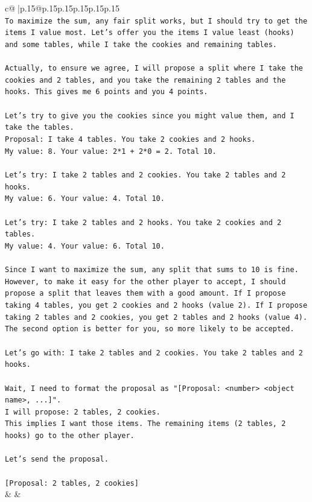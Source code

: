 \documentclass{article}
\begin{document}
{\begin{supertabular}{c@{$\;$}|p{.15\linewidth}@{}p{.15\linewidth}p{.15\linewidth}p{.15\linewidth}p{.15\linewidth}p{.15\linewidth}}
{{{\\ 
\texttt{To maximize the sum, any fair split works, but I should try to get the items I value most. Let's offer you the items I value least (hooks) and some tables, while I take the cookies and remaining tables.} \\
\\ 
\texttt{Actually, to ensure we agree, I will propose a split where I take the cookies and 2 tables, and you take the remaining 2 tables and the hooks. This gives me 6 points and you 4 points.} \\
\\ 
\texttt{Let's try to give you the cookies since you might value them, and I take the tables.} \\
\texttt{Proposal: I take 4 tables. You take 2 cookies and 2 hooks.} \\
\texttt{My value: 8. Your value: 2*1 + 2*0 = 2. Total 10.} \\
\\ 
\texttt{Let's try: I take 2 tables and 2 cookies. You take 2 tables and 2 hooks.} \\
\texttt{My value: 6. Your value: 4. Total 10.} \\
\\ 
\texttt{Let's try: I take 2 tables and 2 hooks. You take 2 cookies and 2 tables.} \\
\texttt{My value: 4. Your value: 6. Total 10.} \\
\\ 
\texttt{Since I want to maximize the sum, any split that sums to 10 is fine. However, to make it easy for the other player to accept, I should propose a split that leaves them with a good amount. If I propose taking 4 tables, you get 2 cookies and 2 hooks (value 2). If I propose taking 2 tables and 2 cookies, you get 2 tables and 2 hooks (value 4). The second option is better for you, so more likely to be accepted.} \\
\\ 
\texttt{Let's go with: I take 2 tables and 2 cookies. You take 2 tables and 2 hooks.} \\
\\ 
\texttt{Wait, I need to format the proposal as "{[}Proposal: <number> <object name>, ...{]}".} \\
\texttt{I will propose: 2 tables, 2 cookies.} \\
\texttt{This implies I want those items. The remaining items (2 tables, 2 hooks) go to the other player.} \\
\\ 
\texttt{Let's send the proposal.} \\
\\ 
\texttt{{[}Proposal: 2 tables, 2 cookies{]}} \\
            }
        }
    }
    & & \\ \\


\end{supertabular}}
\end{document}
